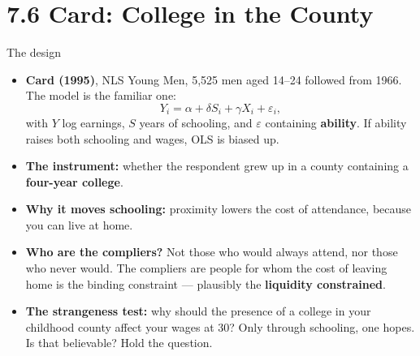 \documentclass[
  11pt,
  ignorenonframetext,
  aspectratio=169,
]{beamer}
\providecommand{\tightlist}{%
  \setlength{\itemsep}{0pt}\setlength{\parskip}{0pt}}
\begin{document}
\section{7.6 Card: College in the
County}\label{card-college-in-the-county}

\begin{frame}{The design}
\protect{}\label{the-design}
\begin{itemize}
\tightlist
\item
  \textbf{Card (1995)}, NLS Young Men, 5,525 men aged 14--24 followed
  from 1966. The model is the familiar one: \[
  Y_i = \alpha + \delta S_i + \gamma X_i + \varepsilon_i,
  \] with \(Y\) log earnings, \(S\) years of schooling, and
  \(\varepsilon\) containing \textbf{ability}. If ability raises both
  schooling and wages, OLS is biased up.
\item
  \textbf{The instrument:} whether the respondent grew up in a county
  containing a \textbf{four-year college}.
\item
  \textbf{Why it moves schooling:} proximity lowers the cost of
  attendance, because you can live at home.
\item
  \textbf{Who are the compliers?} Not those who would always attend, nor
  those who never would. The compliers are people for whom the cost of
  leaving home is the binding constraint --- plausibly the
  \textbf{liquidity constrained}.
\item
  \textbf{The strangeness test:} why should the presence of a college in
  your childhood county affect your wages at 30? Only through schooling,
  one hopes. Is that believable? Hold the question.
\end{itemize}
\end{frame}
\end{document}

